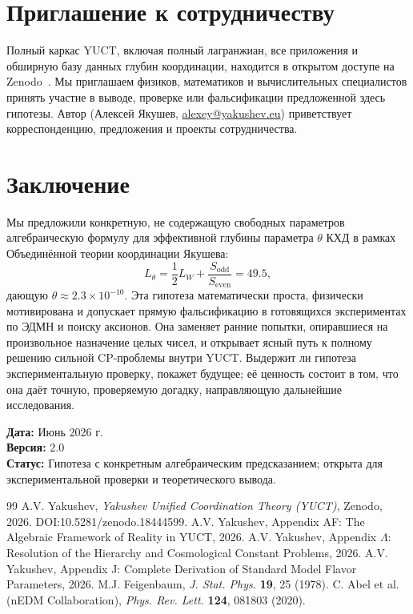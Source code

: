 \documentclass[11pt,a4paper]{article}
\begin{document}
	\section{Приглашение к сотрудничеству}
	\label{sec:invite}
	
	Полный каркас YUCT, включая полный лагранжиан, все приложения и обширную базу данных глубин координации, находится в открытом доступе на Zenodo~\cite{Y1,Y2}. Мы приглашаем физиков, математиков и вычислительных специалистов принять участие в выводе, проверке или фальсификации предложенной здесь гипотезы. Автор (Алексей Якушев, \href{mailto:alexey@yakushev.eu}{alexey@yakushev.eu}) приветствует корреспонденцию, предложения и проекты сотрудничества.
	
	\section{Заключение}
	\label{sec:conclusion}
	
	Мы предложили конкретную, не содержащую свободных параметров алгебраическую формулу для эффективной глубины параметра \(\theta\) КХД в рамках Объединённой теории координации Якушева:
	\[
	L_\theta = \frac{1}{2}L_W + \frac{S_{\mathrm{odd}}}{S_{\mathrm{even}}} = 49.5,
	\]
	дающую \(\theta \approx 2.3 \times 10^{-10}\). Эта гипотеза математически проста, физически мотивирована и допускает прямую фальсификацию в готовящихся экспериментах по ЭДМН и поиску аксионов. Она заменяет ранние попытки, опиравшиеся на произвольное назначение целых чисел, и открывает ясный путь к полному решению сильной CP-проблемы внутри YUCT. Выдержит ли гипотеза экспериментальную проверку, покажет будущее; её ценность состоит в том, что она даёт точную, проверяемую догадку, направляющую дальнейшие исследования.
	
	\vspace{1cm}
	\noindent\textbf{Дата:} Июнь 2026 г.\\
	\textbf{Версия:} 2.0\\
	\textbf{Статус:} Гипотеза с конкретным алгебраическим предсказанием; открыта для экспериментальной проверки и теоретического вывода.
	
	\newpage
	\begin{thebibliography}{99}
		 A.V. Yakushev, \textit{Yakushev Unified Coordination Theory (YUCT)}, Zenodo, 2026. DOI:10.5281/zenodo.18444599.
		 A.V. Yakushev, Appendix AF: The Algebraic Framework of Reality in YUCT, 2026.
		 A.V. Yakushev, Appendix \(\Lambda\): Resolution of the Hierarchy and Cosmological Constant Problems, 2026.
		 A.V. Yakushev, Appendix J: Complete Derivation of Standard Model Flavor Parameters, 2026.
		 M.J. Feigenbaum, \textit{J. Stat. Phys.} \textbf{19}, 25 (1978).
		 C. Abel et al. (nEDM Collaboration), \textit{Phys. Rev. Lett.} \textbf{124}, 081803 (2020).
	\end{thebibliography}
	
\end{document}
